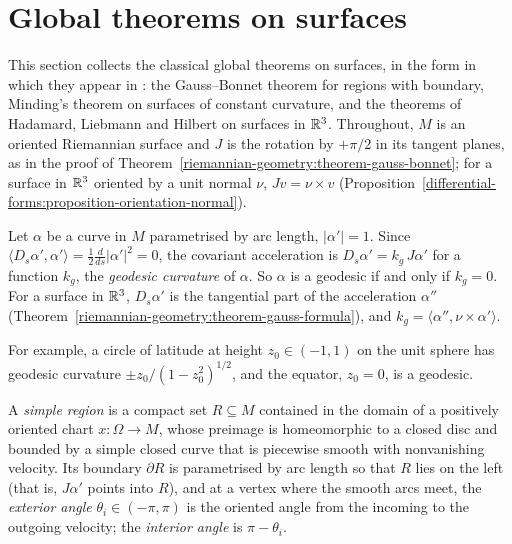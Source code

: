 \section{Global theorems on surfaces}\label{riemannian-geometry:section-surfaces-global}

This section collects the classical global theorems on surfaces, in the form in which they appear in \cite[Chapters 4 and 5]{do-carmo-curves-surfaces}:
the Gauss--Bonnet theorem for regions with boundary, Minding's theorem on surfaces of constant curvature, and the theorems of Hadamard, Liebmann and Hilbert on
surfaces in $\mathbb{R}^3$. Throughout, $M$ is an oriented Riemannian surface and $J$ is the rotation by $+\pi/2$ in its tangent planes, as in the proof of
Theorem~\ref{riemannian-geometry:theorem-gauss-bonnet}; for a surface in $\mathbb{R}^3$ oriented by a unit normal $\nu$, $Jv = \nu \times v$
(Proposition~\ref{differential-forms:proposition-orientation-normal}).

\begin{definition}\label{riemannian-geometry:definition-geodesic-curvature}
Let $\alpha$ be a curve in $M$ parametrised by arc length, $|\alpha'| = 1$. Since $\langle D_s\alpha', \alpha'\rangle = \frac12\frac{d}{ds}|\alpha'|^2 = 0$, the covariant acceleration is
$D_s\alpha' = k_g\,J\alpha'$ for a function $k_g$, the \emph{geodesic curvature} of $\alpha$. So $\alpha$ is a geodesic if and only if $k_g = 0$. For a surface in $\mathbb{R}^3$,
$D_s\alpha'$ is the tangential part of the acceleration $\alpha''$ (Theorem~\ref{riemannian-geometry:theorem-gauss-formula}), and $k_g = \langle\alpha'', \nu \times \alpha'\rangle$.
\end{definition}

For example, a circle of latitude at height $z_0 \in (-1, 1)$ on the unit sphere has geodesic curvature $\pm z_0/(1 - z_0^2)^{1/2}$, and the equator, $z_0 = 0$, is a geodesic.

A \emph{simple region} is a compact set $R \subseteq M$ contained in the domain of a positively oriented chart $x \colon \Omega \to M$, whose preimage is homeomorphic to a closed
disc and bounded by a simple closed curve that is piecewise smooth with nonvanishing velocity. Its boundary $\partial R$ is parametrised by arc length so that $R$ lies on the left
(that is, $J\alpha'$ points into $R$), and at a vertex where the smooth arcs meet, the \emph{exterior angle} $\theta_i \in (-\pi, \pi)$ is the oriented angle from the incoming to the
outgoing velocity; the \emph{interior angle} is $\pi - \theta_i$.


